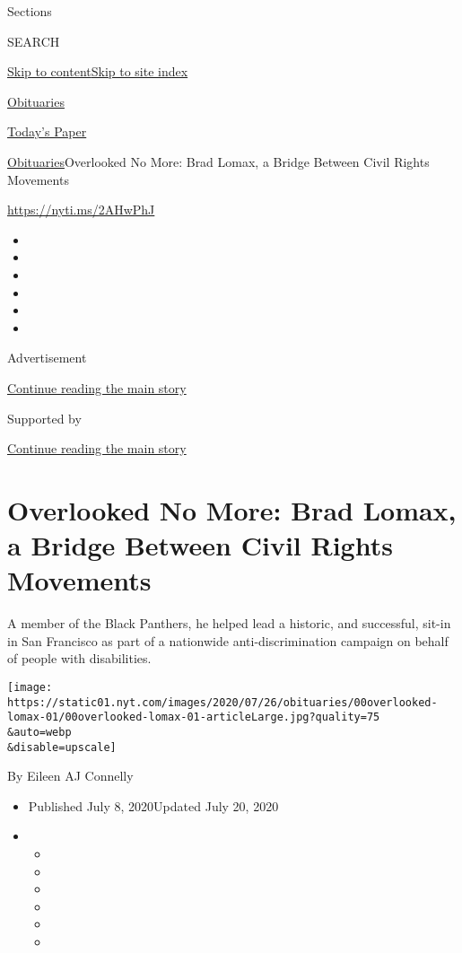 Sections

SEARCH

\protect\hyperlink{site-content}{Skip to
content}\protect\hyperlink{site-index}{Skip to site index}

\href{https://www.nytimes.com/section/obituaries}{Obituaries}

\href{https://myaccount.nytimes.com/auth/login?response_type=cookie\&client_id=vi}{}

\href{https://www.nytimes.com/section/todayspaper}{Today's Paper}

\href{/section/obituaries}{Obituaries}\textbar{}Overlooked No More: Brad
Lomax, a Bridge Between Civil Rights Movements

\url{https://nyti.ms/2AHwPhJ}

\begin{itemize}
\item
\item
\item
\item
\item
\item
\end{itemize}

Advertisement

\protect\hyperlink{after-top}{Continue reading the main story}

Supported by

\protect\hyperlink{after-sponsor}{Continue reading the main story}

\hypertarget{overlooked-no-more-brad-lomax-a-bridge-between-civil-rights-movements}{%
\section{Overlooked No More: Brad Lomax, a Bridge Between Civil Rights
Movements}\label{overlooked-no-more-brad-lomax-a-bridge-between-civil-rights-movements}}

A member of the Black Panthers, he helped lead a historic, and
successful, sit-in in San Francisco as part of a nationwide
anti-discrimination campaign on behalf of people with disabilities.

\texttt{[image: https://static01.nyt.com/images/2020/07/26/obituaries/00overlooked-lomax-01/00overlooked-lomax-01-articleLarge.jpg?quality=75\\\&auto=webp\\\&disable=upscale]}

By Eileen AJ Connelly

\begin{itemize}
\item
  Published July 8, 2020Updated July 20, 2020
\item
  \begin{itemize}
  \item
  \item
  \item
  \item
  \item
  \item
  \end{itemize}
\end{itemize}

